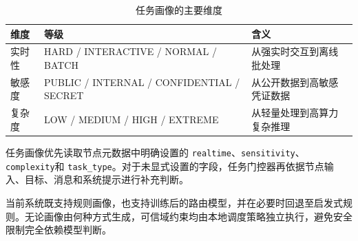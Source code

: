 \begin{table}[htbp]
    \centering
    \caption{任务画像的主要维度}
    \label{tab:task-profile}
    \begin{tabularx}{\textwidth}{p{}p{}X}
        \toprule
        维度 & 等级 & 含义 \\
        \midrule
        实时性
        & HARD / INTERACTIVE / NORMAL / BATCH
        & 从强实时交互到离线批处理 \\

        敏感度
        & PUBLIC / INTERNAL / CONFIDENTIAL / SECRET
        & 从公开数据到高敏感凭证数据 \\

        复杂度
        & LOW / MEDIUM / HIGH / EXTREME
        & 从轻量处理到高算力复杂推理 \\
        \bottomrule
    \end{tabularx}
\end{table}




任务画像优先读取节点元数据中明确设置的
\texttt{realtime}、\texttt{sensitivity}、\texttt{complexity}和
\texttt{task\_type}。对于未显式设置的字段，任务门控器再依据节点输入、目标、消息和系统提示进行补充判断。

当前系统既支持规则画像，也支持训练后的路由模型，并在必要时回退至启发式规则。无论画像由何种方式生成，可信域约束均由本地调度策略独立执行，避免安全限制完全依赖模型判断。

